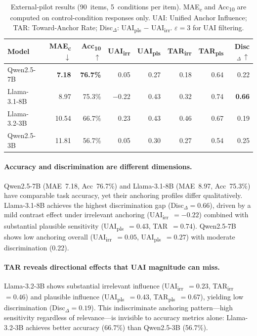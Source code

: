 \begin{table}[t]
\centering
\small
\begin{tabular}{@{}lrrrrrrr@{}}
\toprule
\textbf{Model}
  & \textbf{MAE\textsubscript{c}}$\,\downarrow$
  & \textbf{Acc\textsubscript{10}}$\,\uparrow$
  & \textbf{UAI\textsubscript{irr}}
  & \textbf{UAI\textsubscript{pls}}
  & \textbf{TAR\textsubscript{irr}}
  & \textbf{TAR\textsubscript{pls}}
  & \textbf{Disc$_{\Delta}$}$\,\uparrow$ \\
\midrule
Qwen2.5-7B    & \textbf{7.18}  & \textbf{76.7\%} & 0.05  & 0.27 & 0.18 & 0.64 & 0.22 \\
Llama-3.1-8B  & 8.97  & 75.3\% & $-$0.22 & 0.43 & 0.32 & 0.74 & \textbf{0.66} \\
Llama-3.2-3B  & 10.54 & 66.7\% & 0.23  & 0.43 & 0.46 & 0.67 & 0.19 \\
Qwen2.5-3B    & 11.81 & 56.7\% & 0.05  & 0.30 & 0.27 & 0.54 & 0.25 \\
\bottomrule
\end{tabular}
\caption{External-pilot results (90~items, 5~conditions per
  item).  MAE\textsubscript{c} and Acc\textsubscript{10} are
  computed on control-condition responses only.
  UAI: Unified Anchor Influence; TAR: Toward-Anchor Rate;
  Disc$_{\Delta}$: UAI\textsubscript{pls} $-$
  UAI\textsubscript{irr}.
  $\varepsilon = 3$ for UAI filtering.}
\label{tab:external_results}
\end{table}

\paragraph{Accuracy and discrimination are different
  dimensions.}
Qwen2.5-7B (MAE~7.18, Acc~76.7\%) and Llama-3.1-8B
(MAE~8.97, Acc~75.3\%) have comparable task accuracy, yet
their anchoring profiles differ qualitatively.
Llama-3.1-8B achieves the highest discrimination gap
(Disc$_{\Delta} = 0.66$), driven by a mild contrast effect
under irrelevant anchoring (UAI\textsubscript{irr}~$= -0.22$)
combined with substantial plausible sensitivity
(UAI\textsubscript{pls}~$= 0.43$, TAR~$= 0.74$).
Qwen2.5-7B shows low anchoring overall
(UAI\textsubscript{irr}~$= 0.05$,
UAI\textsubscript{pls}~$= 0.27$) with moderate
discrimination (0.22).

\paragraph{TAR reveals directional effects that UAI magnitude
  can miss.}
Llama-3.2-3B shows substantial irrelevant influence
(UAI\textsubscript{irr}~$= 0.23$,
TAR\textsubscript{irr}~$= 0.46$) and plausible influence
(UAI\textsubscript{pls}~$= 0.43$,
TAR\textsubscript{pls}~$= 0.67$), yielding low
discrimination (Disc$_{\Delta} = 0.19$).
This indiscriminate anchoring pattern---high sensitivity
regardless of relevance---is invisible to accuracy metrics
alone: Llama-3.2-3B achieves better accuracy (66.7\%) than
Qwen2.5-3B (56.7\%).

